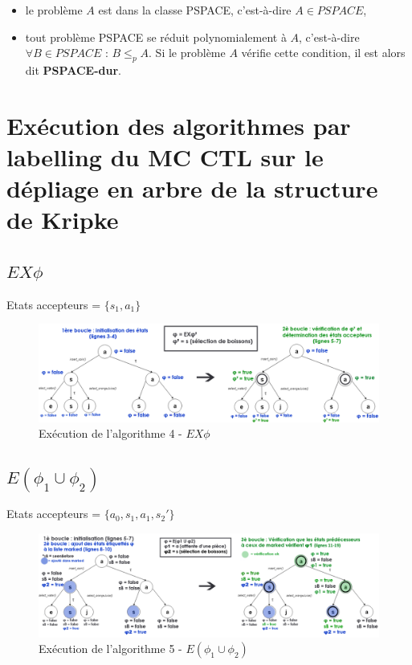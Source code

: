 \documentclass[runningheads,a4paper,10pt]{llncs}
\begin{document}
\begin{subappendices}
\begin{itemize}
\item le problème $A$ est dans la classe PSPACE, c'est-à-dire $A \in PSPACE$,
\item tout problème PSPACE se réduit polynomialement à $A$, c'est-à-dire $\forall B \in PSPACE$ : $B \le_{p} A$. Si le problème $A$ vérifie cette condition, il est alors dit \textbf{PSPACE-dur}.
\end{itemize}

\newpage

\section{Exécution des algorithmes par labelling du MC CTL sur le dépliage en arbre de la structure de Kripke} \label{sec:algo-arbres}

\subsection{$EX\phi$}
\noindent
Etats accepteurs = $\{s_{1}, a_{1}\}$

\begin{figure}
  \centering
   \includegraphics[scale=0.3]{figures/algo-EX.png}
   \caption[Caption for LOF]{Exécution de l'algorithme 4 - $EX\phi$}
   \label{fig:algo-EX}
\end{figure} 


\subsection{$E(\phi_{1} \cup \phi_{2})$}
\noindent
Etats accepteurs = $\{a_{0}, s_{1}, a_{1}, s_{2} '\}$ \\

\begin{figure}
  \centering
   \includegraphics[scale=0.3]{figures/algo-EU.png}
   \caption[Caption for LOF]{Exécution de l'algorithme 5 - $E(\phi_{1} \cup \phi_{2})$}
   \label{fig:algo-EU}
\end{figure}


\end{subappendices}
\end{document}
